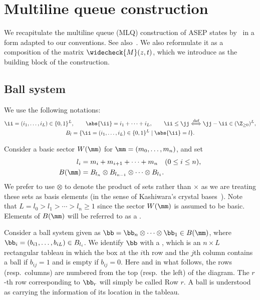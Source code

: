 \section{Multiline queue construction}\label{sec:mlq}

We recapitulate the multiline queue (MLQ) construction of ASEP states by~\cite{Martin20} in a form adapted to our conventions. 
See also~\cite{CMW}.
We also reformulate it as a composition of the matrix $\widecheck{M}(z,t)$, which we introduce as the building block of the construction.

\subsection{Ball system}
We use the following notations:
\begin{gather}
\ii = (i_1, \ldots, i_L) \in \{0,1\}^L, \qquad \abs{\ii} = i_1 + \cdots + i_L, \qquad 
\ii \le \jj \overset{\text{def}}{\Longleftrightarrow}
\jj - \ii \in (\Z_{\ge 0})^L, 
\label{a:ii}\\
B_l = \{ \ii = (i_1, \ldots, i_L) \in \{0,1\}^L \mid \abs{\ii} = l \}.
\label{a:B}
\end{gather}

Consider a basic sector $W(\mm)$ for $\mm = (m_0, \ldots, m_n)$, and set
\begin{align}
l_i &= m_i + m_{i+1} + \cdots + m_n \quad (0 \le i \le n), \label{a:lk} \\
B(\mm) &= B_{l_n} \otimes B_{l_{n-1}} \otimes \cdots \otimes B_{l_1}. \label{a:bk}
\end{align} 
We prefer to use $\otimes$ to denote the product of sets rather than $\times$ as we are treating these sets as basis elements (in the sense of Kashiwara's crystal bases~\cite{Kashiwara90}).
Note that $L = l_0 > l_1 > \cdots > l_n \ge 1$ since the sector $W(\mm)$ is assumed to be basic.
Elements of $B(\mm)$ will be referred to as a .

Consider a ball system given as $\bb = \bb_n \otimes \cdots \otimes \bb_1 \in B(\mm)$, where 
$\bb_i = (b_{i1}, \ldots, b_{iL}) \in B_{l_i}$.
We identify $\bb$ with a , which is an $n \times L$ rectangular tableau
in which the box at the $i$th row and the $j$th column contains a ball if $b_{ij} = 1$ and is empty if $b_{ij} = 0$.
Here and in what follows, the rows (resp.\ columns) are numbered from the top 
(resp.\ the left) of the diagram.
The $r$-th row corresponding to $\bb_r$ will simply be called Row $r$.
A ball is understood as carrying the information of its location in the tableau.

